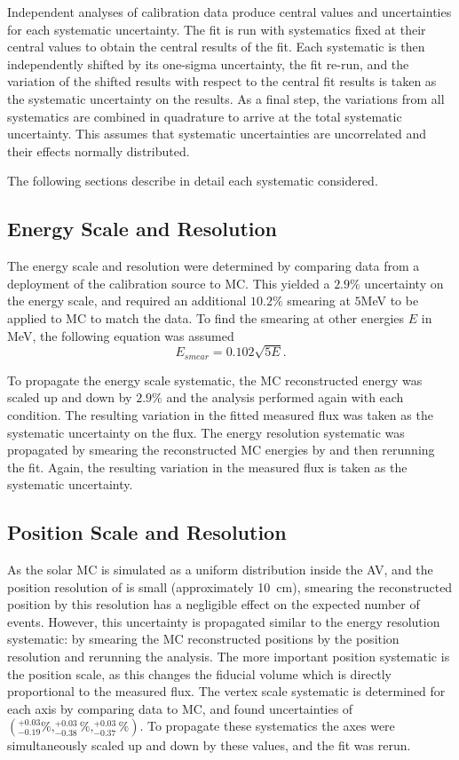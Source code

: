 Independent analyses of \N calibration data produce central values and uncertainties for each systematic uncertainty.
The fit is run with systematics fixed at their central values to obtain the central results of the fit.
Each systematic is then independently shifted by its one-sigma uncertainty, the fit re-run, and the variation of the shifted results with respect to the central fit results is taken as the systematic uncertainty on the results.
As a final step, the variations from all systematics are combined in quadrature to arrive at the total systematic uncertainty.
This assumes that systematic uncertainties are uncorrelated and their effects normally distributed.

The following sections describe in detail each systematic considered.

\subsection{Energy Scale and Resolution}

The energy scale and resolution were determined by comparing data from a deployment of the \N calibration source to MC. 
This yielded a $2.9\%$ uncertainty on the energy scale, and required an additional $10.2\%$ smearing at $5$MeV to be applied to MC to match the data.
To find the smearing at other energies $E$ in MeV, the following equation was assumed
\begin{equation}
\label{eqn:solar:esmear}
E_{smear} = 0.102\sqrt{5 E}.
\end{equation}

To propagate the energy scale systematic, the MC reconstructed energy was scaled up and down by $2.9\%$ and the analysis performed again with each condition.
The resulting variation in the fitted measured flux was taken as the systematic uncertainty on the flux.
The energy resolution systematic was propagated by smearing the reconstructed MC energies by  and then rerunning the fit.
Again, the resulting variation in the measured flux is taken as the systematic uncertainty.

\subsection{Position Scale and Resolution}

As the solar MC is simulated as a uniform distribution inside the AV, and the position resolution of {\snop} is small (approximately 10~cm), smearing the reconstructed position by this resolution has a negligible effect on the expected number of events.
However, this uncertainty is propagated similar to the energy resolution systematic: by smearing the MC reconstructed positions by the position resolution and rerunning the analysis.
The more important position systematic is the position scale, as this changes the fiducial volume which is directly proportional to the measured flux.
The vertex scale systematic is determined for each axis by comparing \N data to MC, and found uncertainties of $(^{+0.03}_{-0.19}\%,^{+0.03}_{-0.38}\%,^{+0.03}_{-0.37}\%)$.
To propagate these systematics the axes were simultaneously scaled up and down by these values, and the fit was rerun.

